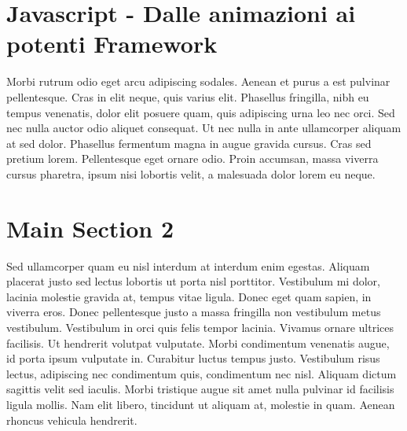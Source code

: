 \section{Javascript - Dalle animazioni ai potenti Framework}
Morbi rutrum odio eget arcu adipiscing sodales. Aenean et purus a est pulvinar pellentesque. Cras in elit neque, quis varius elit. Phasellus fringilla, nibh eu tempus venenatis, dolor elit posuere quam, quis adipiscing urna leo nec orci. Sed nec nulla auctor odio aliquet consequat. Ut nec nulla in ante ullamcorper aliquam at sed dolor. Phasellus fermentum magna in augue gravida cursus. Cras sed pretium lorem. Pellentesque eget ornare odio. Proin accumsan, massa viverra cursus pharetra, ipsum nisi lobortis velit, a malesuada dolor lorem eu neque.


\section{Main Section 2}

Sed ullamcorper quam eu nisl interdum at interdum enim egestas. Aliquam placerat justo sed lectus lobortis ut porta nisl porttitor. Vestibulum mi dolor, lacinia molestie gravida at, tempus vitae ligula. Donec eget quam sapien, in viverra eros. Donec pellentesque justo a massa fringilla non vestibulum metus vestibulum. Vestibulum in orci quis felis tempor lacinia. Vivamus ornare ultrices facilisis. Ut hendrerit volutpat vulputate. Morbi condimentum venenatis augue, id porta ipsum vulputate in. Curabitur luctus tempus justo. Vestibulum risus lectus, adipiscing nec condimentum quis, condimentum nec nisl. Aliquam dictum sagittis velit sed iaculis. Morbi tristique augue sit amet nulla pulvinar id facilisis ligula mollis. Nam elit libero, tincidunt ut aliquam at, molestie in quam. Aenean rhoncus vehicula hendrerit.